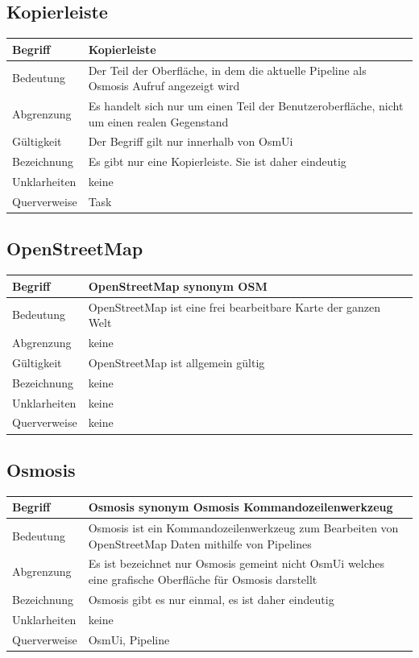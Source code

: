 \documentclass[a4paper,12pt]{scrartcl}
\begin{document}
\begin{center}
\subsection{Kopierleiste}
\begin{tabular}{|p{5cm}|p{10cm}|}
\hline Begriff & \textbf{Kopierleiste} \\ 
\hline Bedeutung & Der Teil der Oberfläche, in dem die aktuelle Pipeline als Osmosis Aufruf angezeigt wird \\ 
\hline Abgrenzung & Es handelt sich nur um einen Teil der Benutzeroberfläche, nicht um einen realen Gegenstand \\ 
\hline Gültigkeit & Der Begriff gilt nur innerhalb von OsmUi \\ 
\hline Bezeichnung & Es gibt nur eine Kopierleiste. Sie ist daher eindeutig \\ 
\hline Unklarheiten & keine \\ 
\hline Querverweise & Task \\ 
\hline 
\end{tabular}
\subsection{OpenStreetMap}
\begin{tabular}{|p{5cm}|p{10cm}|}
\hline Begriff & \textbf{OpenStreetMap} synonym OSM\\ 
\hline Bedeutung & OpenStreetMap ist eine frei bearbeitbare Karte der ganzen Welt\\
\hline Abgrenzung & keine\\ 
\hline Gültigkeit & OpenStreetMap ist allgemein gültig\\ 
\hline Bezeichnung & keine\\ 
\hline Unklarheiten & keine \\ 
\hline Querverweise & keine \\ 
\hline 
\end{tabular}
\subsection{Osmosis}
\begin{tabular}{|p{5cm}|p{10cm}|}
\hline Begriff & \textbf{Osmosis} synonym Osmosis Kommandozeilenwerkzeug\\ 
\hline Bedeutung & Osmosis ist ein Kommandozeilenwerkzeug zum Bearbeiten von OpenStreetMap Daten mithilfe von Pipelines \\ 
\hline Abgrenzung & Es ist bezeichnet nur Osmosis gemeint nicht OsmUi welches eine grafische Oberfläche für Osmosis darstellt\\  
\hline Bezeichnung & Osmosis gibt es nur einmal, es ist daher eindeutig \\ 
\hline Unklarheiten & keine \\ 
\hline Querverweise & OsmUi, Pipeline \\ 
\hline 
\end{tabular}

\end{center}
\end{document}
